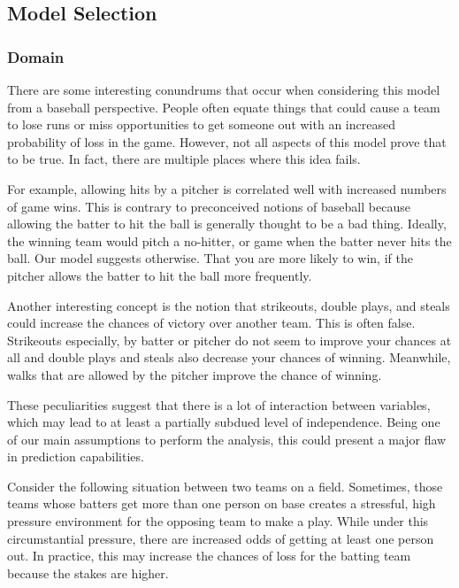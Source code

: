 \documentclass[
]{article}
\begin{document}
\hypertarget{model-selection}{%
\subsection{Model Selection}\label{model-selection}}

\hypertarget{domain}{%
\subsubsection{Domain}\label{domain}}

There are some interesting conundrums that occur when considering this
model from a baseball perspective. People often equate things that could
cause a team to lose runs or miss opportunities to get someone out with
an increased probability of loss in the game. However, not all aspects
of this model prove that to be true. In fact, there are multiple places
where this idea fails.

For example, allowing hits by a pitcher is correlated well with
increased numbers of game wins. This is contrary to preconceived notions
of baseball because allowing the batter to hit the ball is generally
thought to be a bad thing. Ideally, the winning team would pitch a
no-hitter, or game when the batter never hits the ball. Our model
suggests otherwise. That you are more likely to win, if the pitcher
allows the batter to hit the ball more frequently.

Another interesting concept is the notion that strikeouts, double plays,
and steals could increase the chances of victory over another team. This
is often false. Strikeouts especially, by batter or pitcher do not seem
to improve your chances at all and double plays and steals also decrease
your chances of winning. Meanwhile, walks that are allowed by the
pitcher improve the chance of winning.

These peculiarities suggest that there is a lot of interaction between
variables, which may lead to at least a partially subdued level of
independence. Being one of our main assumptions to perform the analysis,
this could present a major flaw in prediction capabilities.

Consider the following situation between two teams on a field.
Sometimes, those teams whose batters get more than one person on base
creates a stressful, high pressure environment for the opposing team to
make a play. While under this circumstantial pressure, there are
increased odds of getting at least one person out. In practice, this may
increase the chances of loss for the batting team because the stakes are
higher.
\end{document}
